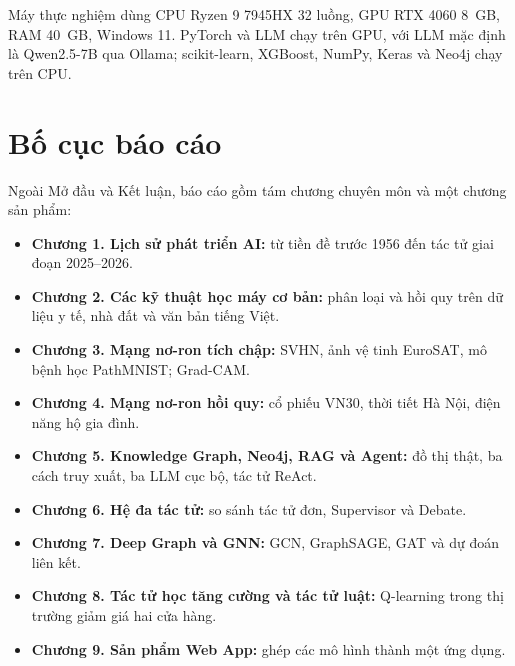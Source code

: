 Máy thực nghiệm dùng CPU Ryzen 9 7945HX 32 luồng, GPU RTX 4060 8~GB, RAM 40~GB, Windows 11. PyTorch và LLM chạy trên GPU, với LLM mặc định là Qwen2.5-7B qua Ollama; scikit-learn, XGBoost, NumPy, Keras và Neo4j chạy trên CPU.

\section*{Bố cục báo cáo}
Ngoài Mở đầu và Kết luận, báo cáo gồm tám chương chuyên môn và một chương sản phẩm:
\begin{itemize}
  \item \textbf{Chương 1. Lịch sử phát triển AI:} từ tiền đề trước 1956 đến tác tử giai đoạn 2025--2026.
  \item \textbf{Chương 2. Các kỹ thuật học máy cơ bản:} phân loại và hồi quy trên dữ liệu y tế, nhà đất và văn bản tiếng Việt.
  \item \textbf{Chương 3. Mạng nơ-ron tích chập:} SVHN, ảnh vệ tinh EuroSAT, mô bệnh học PathMNIST; Grad-CAM.
  \item \textbf{Chương 4. Mạng nơ-ron hồi quy:} cổ phiếu VN30, thời tiết Hà Nội, điện năng hộ gia đình.
  \item \textbf{Chương 5. Knowledge Graph, Neo4j, RAG và Agent:} đồ thị thật, ba cách truy xuất, ba LLM cục bộ, tác tử ReAct.
  \item \textbf{Chương 6. Hệ đa tác tử:} so sánh tác tử đơn, Supervisor và Debate.
  \item \textbf{Chương 7. Deep Graph và GNN:} GCN, GraphSAGE, GAT và dự đoán liên kết.
  \item \textbf{Chương 8. Tác tử học tăng cường và tác tử luật:} Q-learning trong thị trường giảm giá hai cửa hàng.
  \item \textbf{Chương 9. Sản phẩm Web App:} ghép các mô hình thành một ứng dụng.
\end{itemize}
